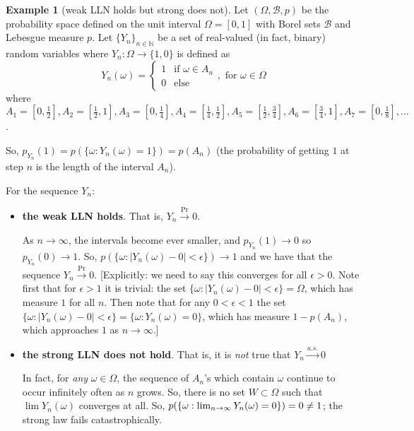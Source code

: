 \documentclass[a4paper]{article}
\theoremstyle{definition}
\newtheorem*{example}{Example}
\renewcommand\right\mright%
\renewcommand\left\mleft%
\begin{document}
\begin{example}[weak LLN holds but strong does not]
  Let $(\Omega, \mathcal{B}, p)$ be the
  probability space defined on the unit interval $\Omega = [0,1]$ with Borel
  sets $\mathcal{B}$ and Lebesgue measure $p$. 
  Let $\{Y_n\}_{n\in\mathbb{N}}$ be a
  set of real-valued (in fact, binary)
  random variables where $Y_n\mathrel{:}\Omega\to \{1,0\}$ is
  defined as
  \begin{equation*}
    Y_n(\omega) =
    \begin{cases}
      1 & \text{if }\omega\in A_n\\
      0 & \text{else}
    \end{cases},\text{ for }\omega\in\Omega
  \end{equation*}
  where $A_1 = [0,\frac{1}{2}], A_2 = [\frac{1}{2},1],  A_3 = [0,\frac{1}{4}],
  A_4 = [\frac{1}{4},\frac{1}{2}], 
  A_5 = [\frac{1}{2},\frac{3}{4}], A_6 = [\frac{3}{4}, 1], A_7 =
  [0,\frac{1}{8}], \ldots$.
  
  So, $p_{Y_n}(1) = p(\{\omega\mathrel{:}Y_n(\omega) = 1\}) = p(A_n)$
  (the probability of getting $1$ at step $n$ is the length of the
  interval $A_n$). 

  For the sequence $Y_n$:
  \begin{itemize}
    \item \textbf{the weak LLN holds}. That is, $Y_n \xrightarrow{\Pr} 0$.

      As $n\to \infty$, the intervals become ever smaller, and $p_{Y_n}(1)
      \to 0$ so $p_{Y_n}(0) \to 1$.  So, $p(\{\omega\mathrel{:} |Y_n(\omega) - 0| <
      \epsilon\})\to 1$ and we have that the sequence $Y_n \xrightarrow{\Pr} 0$.
      [Explicitly: we need to say this converges for all $\epsilon > 0$. 
      Note first that for $\epsilon>1$ it is trivial: the set $\{\omega
      \mathrel{:} |Y_n(\omega) - 0|<\epsilon\} = \Omega$, which has measure $1$
      for all $n$.    Then note that for any $0<\epsilon<1$ the set $\{\omega
        \mathrel{:} |Y_n(\omega) - 0|<\epsilon\} = \{\omega \mathrel{:} Y_n(\omega) =
      0\} $, which has measure $1-p(A_n)$, which approaches $1$ as
      $n\to\infty$.]

    \item \textbf{the strong LLN does not hold}. That is, it is \emph{not} true
      that $Y_n\xrightarrow{a.s.} 0$

      In fact, for \emph{any} $\omega\in\Omega$, the sequence of $A_n$'s which
      contain $\omega$ continue to occur infinitely often as $n$ grows.  So,
      there is no set $W\subset \Omega$ such that $\lim Y_n(\omega)$ converges
      at all. So, $p\left( \{\omega\mathrel{:}\lim_{n\to\infty}Y_n(\omega)=0
      \}\right) = 0 \neq 1 $; the strong law fails catastrophically.
  \end{itemize}
\end{example}
\end{document}
